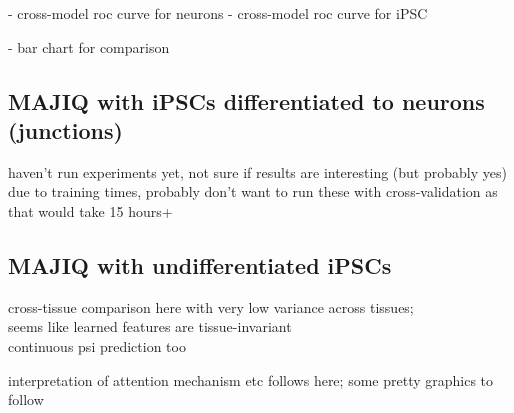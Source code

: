 - cross-model roc curve for neurons
- cross-model roc curve for iPSC

- bar chart for comparison

\subsection{MAJIQ with iPSCs differentiated to neurons (junctions)}
haven't run experiments yet, not sure if results are interesting (but probably yes)\\
due to training times, probably don't want to run these with cross-validation as that would take 15 hours+


\subsection{MAJIQ with undifferentiated iPSCs} \label{subsec:hipsci_ipsc_majiq}



cross-tissue comparison here with very low variance across tissues;\\
seems like learned features are tissue-invariant\\

continuous psi prediction too

interpretation of attention mechanism etc follows here; some pretty graphics to follow